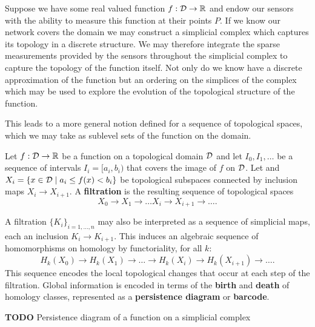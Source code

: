 Suppose we have some real valued function $f:{\mathcal{D}}\to\mathbb{R}$ and endow our sensors with the ability to measure this function at their points $P$.
If we know our network covers the domain we may construct a simplicial complex which captures its topology in a discrete structure.
We may therefore integrate the sparse measurements provided by the sensors throughout the simplicial complex to capture the topology of the function itself.
Not only do we know have a discrete approximation of the function but an ordering on the simplices of the complex which may be used to explore the evolution of the topological structure of the function.

This leads to a more general notion defined for a sequence of topological spaces, which we may take as sublevel sets of the function on the domain.
\begin{definition}
    Let $f:{\mathcal{D}}\to\mathbb{R}$ be a function on a topological domain ${\mathcal{D}}$ and let $I_0, I_1,\ldots$ be a sequence of intervals $I_i = [a_i, b_i)$ that covers the image of $f$ on ${\mathcal{D}}$.
    Let and $X_i = \{x\in{\mathcal{D}}\mid a_i\leq f(x) < b_i\}$ be topological subspaces connected by inclusion maps $X_i\to X_{i+1}$.
    A \textbf{filtration} is the resulting sequence of topological spaces
    \[X_0\to X_1\to\ldots X_i\to X_{i+1}\to\ldots .\]
\end{definition}
A filtration $\{K_i\}_{i=1,\ldots,n}$ may also be interpreted as a sequence of simplicial maps, each an inclusion $K_i\to K_{i+1}$.
This induces an algebraic sequence of homomorphisms on homology by functoriality, for all $k$:
\[ H_k(X_0)\to H_k(X_1)\to\ldots\to H_k(X_i)\to H_k(X_{i+1})\to\ldots . \]
This sequence encodes the local topological changes that occur at each step of the filtration.
Global information is encoded in terms of the \textbf{birth} and \textbf{death} of homology classes, represented as a \textbf{persistence diagram} or \textbf{barcode}.

\vspace{0.25in}
\textbf{TODO} Persistence diagram of a function on a simplicial complex
\vspace{0.25in}

